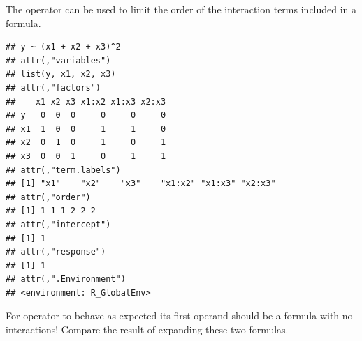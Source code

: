 \documentclass[krantz2]{krantz}\usepackage{knitr}%
\begin{document}
The \code{\textasciicircum{}} operator can be used to limit the order of the interaction terms included in a formula.

\begin{knitrout}\footnotesize
{}\color{fgcolor}\begin{kframe}
\begin{alltt}
 \hlopt{~}  \hlopt{+}  \hlopt{+} \hlopt{^}
 \hlopt{~}  \hlopt{+}  \hlopt{+}  \hlopt{+} \hlopt{:} \hlopt{+} \hlopt{:} \hlopt{+} \hlopt{:}
\end{alltt}
\end{kframe}
\end{knitrout}

\begin{knitrout}\footnotesize
{}\color{fgcolor}\begin{kframe}
\begin{alltt}
 \hlopt{~}  \hlopt{+}  \hlopt{+} \hlopt{^}\hlstd{)}
\end{alltt}
\begin{verbatim}
## y ~ (x1 + x2 + x3)^2
## attr(,"variables")
## list(y, x1, x2, x3)
## attr(,"factors")
##    x1 x2 x3 x1:x2 x1:x3 x2:x3
## y   0  0  0     0     0     0
## x1  1  0  0     1     1     0
## x2  0  1  0     1     0     1
## x3  0  0  1     0     1     1
## attr(,"term.labels")
## [1] "x1"    "x2"    "x3"    "x1:x2" "x1:x3" "x2:x3"
## attr(,"order")
## [1] 1 1 1 2 2 2
## attr(,"intercept")
## [1] 1
## attr(,"response")
## [1] 1
## attr(,".Environment")
## <environment: R_GlobalEnv>
\end{verbatim}
\end{kframe}
\end{knitrout}

\begin{playground}
For operator \code{\textasciicircum{}} to behave as expected its first operand should be a formula with no interactions!  Compare the result of expanding these two formulas.

\begin{knitrout}\footnotesize
{}\color{fgcolor}\begin{kframe}
\begin{alltt}
 \hlopt{~}  \hlopt{+}  \hlopt{+} \hlopt{^}
 \hlopt{~}  \hlopt{*}  \hlopt{*} \hlopt{^}
\end{alltt}
\end{kframe}
\end{knitrout}

\end{playground}
\end{document}
